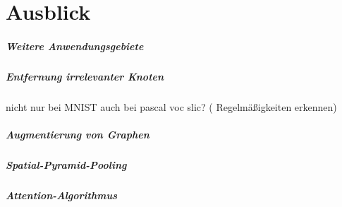 \chapter{Ausblick}
\label{ausblick}

\paragraph{Weitere Anwendungsgebiete}
\label{weitere_anwendungsgebiete}

\paragraph{Entfernung irrelevanter Knoten}
\label{entfernung_irrelevanter_knoten}

nicht nur bei MNIST
auch bei pascal voc slic? (\zB{} Regelmäßigkeiten erkennen)

\paragraph{Augmentierung von Graphen}
\label{augmentierung_von_graphen}

\paragraph{Spatial-Pyramid-Pooling}
\label{spatial_pyramid_pooling}

\paragraph{Attention-Algorithmus}
\label{attention_algorithmus}
